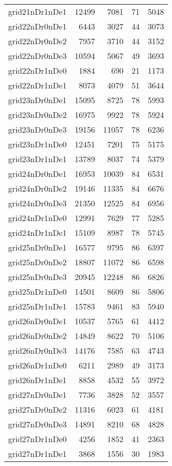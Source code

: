 \documentclass[../../../thesis.tex]{subfiles}
\begin{document}
\begin{longtable}{lrrrr}
grid21nDr1nDe1 & 12499 & 7081 & 71 & 5048 \\
grid22nDr0nDe1 & 6443 & 3027 & 44 & 3073 \\
grid22nDr0nDe2 & 7957 & 3710 & 44 & 3152 \\
grid22nDr0nDe3 & 10594 & 5067 & 49 & 3693 \\
grid22nDr1nDe0 & 1884 & 690 & 21 & 1173 \\
grid22nDr1nDe1 & 8073 & 4079 & 51 & 3644 \\
grid23nDr0nDe1 & 15095 & 8725 & 78 & 5993 \\
grid23nDr0nDe2 & 16975 & 9922 & 78 & 5924 \\
grid23nDr0nDe3 & 19156 & 11057 & 78 & 6236 \\
grid23nDr1nDe0 & 12451 & 7201 & 75 & 5175 \\
grid23nDr1nDe1 & 13789 & 8037 & 74 & 5379 \\
grid24nDr0nDe1 & 16953 & 10039 & 84 & 6531 \\
grid24nDr0nDe2 & 19146 & 11335 & 84 & 6676 \\
grid24nDr0nDe3 & 21350 & 12525 & 84 & 6956 \\
grid24nDr1nDe0 & 12991 & 7629 & 77 & 5285 \\
grid24nDr1nDe1 & 15109 & 8987 & 78 & 5745 \\
grid25nDr0nDe1 & 16577 & 9795 & 86 & 6397 \\
grid25nDr0nDe2 & 18807 & 11072 & 86 & 6598 \\
grid25nDr0nDe3 & 20945 & 12248 & 86 & 6826 \\
grid25nDr1nDe0 & 14501 & 8609 & 86 & 5806 \\
grid25nDr1nDe1 & 15783 & 9461 & 83 & 5940 \\
grid26nDr0nDe1 & 10537 & 5765 & 61 & 4412 \\
grid26nDr0nDe2 & 14849 & 8622 & 70 & 5106 \\
grid26nDr0nDe3 & 14176 & 7585 & 63 & 4743 \\
grid26nDr1nDe0 & 6211 & 2989 & 49 & 3173 \\
grid26nDr1nDe1 & 8858 & 4532 & 55 & 3972 \\
grid27nDr0nDe1 & 7736 & 3828 & 52 & 3557 \\
grid27nDr0nDe2 & 11316 & 6023 & 61 & 4181 \\
grid27nDr0nDe3 & 14891 & 8210 & 68 & 4828 \\
grid27nDr1nDe0 & 4256 & 1852 & 41 & 2363 \\
grid27nDr1nDe1 & 3868 & 1556 & 30 & 1983 \\

\end{longtable}
\end{document}
